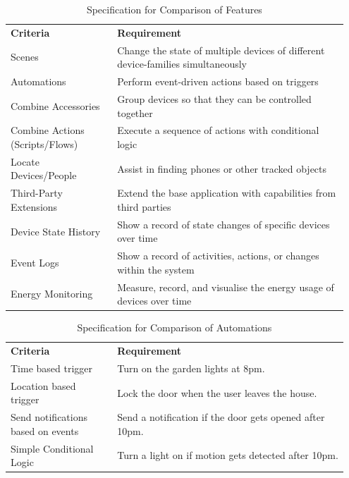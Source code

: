 \begin{table}[H]
    \centering
    \caption{Specification for Comparison of Features}
    \label{tab:spec_features}
    \begin{tabular}{ >{\raggedright} p{0.3\linewidth} p{0.65\linewidth} }
        \toprule
        \multicolumn{2}{ l }{\textbf{Features}} \\
        \midrule
        \textbf{Criteria} & \textbf{Requirement} \\
        \midrule
        Scenes & Change the state of multiple devices of different device-families simultaneously \\ \addlinespace
        Automations & Perform event-driven actions based on triggers \\ \addlinespace
        Combine Accessories & Group devices so that they can be controlled together \\ \addlinespace
        Combine Actions (Scripts/Flows) & Execute a sequence of actions with conditional logic \\ \addlinespace
        Locate Devices/People & Assist in finding phones or other tracked objects \\ \addlinespace
        Third-Party Extensions & Extend the base application with capabilities from third parties \\ \addlinespace
        Device State History & Show a record of state changes of specific devices over time \\ \addlinespace
        Event Logs & Show a record of activities, actions, or changes within the system \\ \addlinespace
        Energy Monitoring & Measure, record, and visualise the energy usage of devices over time \\
        \bottomrule
    \end{tabular}
\end{table}

\begin{table}[H]
    \centering
    \caption{Specification for Comparison of Automations}
    \label{tab:spec_automations}
    \begin{tabular}{ >{\raggedright} p{0.3\linewidth} p{0.65\linewidth} }
        \toprule
        \multicolumn{2}{ l }{\textbf{Automations}} \\
        \midrule
        \textbf{Criteria} & \textbf{Requirement} \\
        \midrule
        Time based trigger & Turn on the garden lights at 8pm.\\ \addlinespace
        Location based trigger & Lock the door when the user leaves the house.\\ \addlinespace
        Send notifications based on events & Send a notification if the door gets opened after 10pm.\\ \addlinespace
        Simple Conditional Logic & Turn a light on if motion gets detected after 10pm.\\
        \bottomrule
    \end{tabular}
\end{table}

